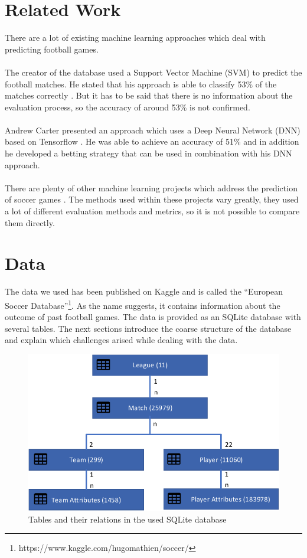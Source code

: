 \documentclass[a4paper]{article}
\begin{document}
\section{Related Work} \label{relatedwork}
There are a lot of existing machine learning approaches which deal with
predicting football games.
\\\\
The creator of the database used a Support Vector Machine (SVM) to predict the
football matches. He stated that his approach is able to classify 53\% of the
matches correctly \cite{SVM-Kaggle}. But it has to be said that there is no
information about the evaluation process, so the accuracy of around 53\% is not
confirmed.
\\\\
Andrew Carter presented an approach which uses a Deep Neural Network (DNN) based
on Tensorflow \cite{DeepLTensor}. He was able to achieve an accuracy of 51\% and
in addition he developed a betting strategy that can be used in combination with
his DNN approach.
\\\\
There are plenty of other machine learning projects which address the prediction
of soccer games \cite{MLFramework1, MLFramework2}. The methods used within these
projects vary greatly, they used a lot of different evaluation methods and
metrics, so it is not possible to compare them directly.

\section{Data} \label{data}
The data we used has been published on Kaggle and is called the ``European
Soccer Database''\footnote{https://www.kaggle.com/hugomathien/soccer/}. As the
name suggests, it contains information about the outcome of past football games.
The data is provided as an SQLite database with several tables. The next
sections introduce the coarse structure of the database and explain which
challenges arised while dealing with the data.

\begin{figure}[!htbp]
	\centering
    \includegraphics[scale=0.8]{img/table-layout-nn}
	\caption{Tables and their relations in the used SQLite database}
	\label{fig:data}
\end{figure}
\end{document}
